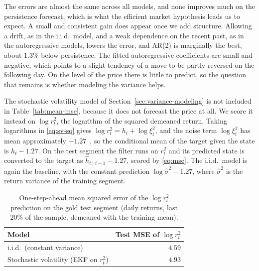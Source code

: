 The errors are almost the same across all models, and none improves much on the persistence forecast, which is what the efficient market hypothesis leads us to expect. A small and consistent gain does appear once we add structure. Allowing a drift, as in the i.i.d.\ model, and a weak dependence on the recent past, as in the autoregressive models, lowers the error, and AR(2) is marginally the best, about $1.3\%$ below persistence. The fitted autoregressive coefficients are small and negative, which points to a slight tendency of a move to be partly reversed on the following day. On the level of the price there is little to predict, so the question that remains is whether modeling the variance helps.

The stochastic volatility model of Section~\ref{sec:variance-modeling} is not included in Table~\ref{tab:mean-mse}, because it does not forecast the price at all. We score it instead on $\log r_t^2$, the logarithm of the squared demeaned return. Taking logarithms in \eqref{eq:sv-sq} gives $\log r_t^2 = h_t + \log \xi_t^2$, and the noise term $\log \xi_t^2$ has mean approximately $-1.27$~\cite[Section~7.3]{triantafyllopoulos:bayesian_state_space}, so the conditional mean of the target given the state is $h_t - 1.27$. On the test segment the filter runs on $r_t^2$ and its predicted state is converted to the target as $\hat{h}_{t \mid t-1} - 1.27$, scored by \eqref{eq:mse}. The i.i.d.\ model is again the baseline, with the constant prediction $\log \hat{\sigma}^2 - 1.27$, where $\hat{\sigma}^2$ is the return variance of the training segment.

\begin{table}
\centering
\begin{tabular}{lr}
\hline
Model & Test MSE of $\log r_t^2$ \\
\hline
i.i.d.\ (constant variance) & $4.59$ \\
Stochastic volatility (EKF on $r_t^2$) & $4.93$ \\
\hline
\end{tabular}
\caption{One-step-ahead mean squared error of the $\log r_t^2$ prediction on
the gold test segment (daily returns, last $20\%$ of the sample, demeaned with
the training mean).}
\label{tab:sv-mse}
\end{table}

